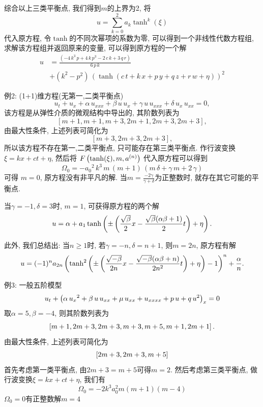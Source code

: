 \begin{frame}
综合以上三类平衡点, 我们得到$m$的上界为2, 将
\[
    u=\sum_{k=0}^2{a_k\tanh^k(\xi)}
\]
代入原方程, 令$\tanh$的不同次幂项的系数为零, 可以得到一个非线性代数方程组, 求解该方程组并返回原来的变量, 可以得到原方程的一个解
\begin{equation*}
\begin{aligned}
    u&=\frac{\left( -4\,{k}^{3}\,p+4\,k\,{p}^{3}-2\,c\,k+3\,q\,r\right) }{6\,p\,k} \\ 
    &+\left( {k}^{2}-{p}^{2}\right) \,\left( \tanh\left( c\,t+k\,x+p\,y+q\,z+r\,w+\eta\right) \right) ^{2}
\end{aligned}
\end{equation*}
\end{frame}

\begin{frame}{例2: (1+1)维方程(无第一,二类平衡点)}
\begin{equation*}
    {{u}_{t}}+{{u}_{x}}+\alpha\,{{u}_{xxx}}+\beta\,u\,{{u}_{x}}+\gamma\,u\,{{u}_{xxx}}+\delta\,{{u}_{x}}\,{{u}_{xx}}=0,
\end{equation*}
该方程是从弹性介质的微观结构中导出的, 其阶数列表为
\[
    [m+1,m+1,m+3,2m+1,2m+3,2m+3],
\]
由最大性条件, 上述列表可简化为 
\[
    [m+3,2m+3,2m+3], 
\]
所以该方程不存在第一,二类平衡点, 只可能存在第三类平衡点.  作行波变换$\xi=kx+ct+\eta$, 然后将 $F\left(\tanh(\xi),m,a^{(n)}\right)$ 代入原方程可以得到 
\begin{equation*}
    \Omega_0=-{{{a}_{0}}}^{2}\,{k}^{3}\,m\,\left( m+1\right) \,\left( m\,\delta+\gamma\,m+2\,\gamma\right)
\end{equation*}
可得 $m=0$, 原方程没有非平凡的解. 当$m=\frac{-2 \gamma}{\gamma+\delta}$为正整数时, 就存在其它可能的平衡点.
\end{frame}

\begin{frame}
当$\gamma=-1,\delta=3$时, $m=1$, 可获得原方程的两个解 
\[
    u=\alpha+a_1\tanh\left(\pm\left(\frac{\sqrt{\beta}}{2}x-\frac{\sqrt{\beta}(\alpha \beta+1)}{2}t\right)+\eta\right). 
\]

此外, 我们总结出: 当$n\ge 1$时, 若$\gamma=-n,\delta=n+1$, 则$m=2n$, 原方程有解 
\begin{equation*}
u=(-1)^n a_{2n} \left(\tanh^2\left(\pm\left(\frac{\sqrt{-\beta}}{2n}x-\frac{\sqrt{-\beta}(\alpha\beta+n)}{2n^2}t\right)+\eta\right)-1\right)^n+\frac{\alpha}{n} .
\end{equation*}
\end{frame}

\begin{frame}{例3: 一般五阶模型}
\[
    u_t+\left(\alpha\,{{{u}_{x}}}^{2}+\beta\,u\,{{u}_{xx}}+\mu\,{{u}_{xx}}+{{u}_{xxxx}}+p\,u+q\,{u}^{2} \right)_x = 0
\]
取$\alpha=5,\beta=-4$, 则其阶数列表为 
\[
    \left[m+1,2m+3,2m+3,m+3,m+5,m+1,2m+1\right] .
\]
由最大性条件, 上述列表可简化为 
\[
    \left[2m+3,2m+3,m+5\right]
\]
首先考虑第一类平衡点, 由$2m+3=m+5$可得$m=2$.
然后考虑第三类平衡点, 做行波变换$\xi=kx+ct+\eta$, 我们有 
\[
    \Omega_0 = -2k^3a_0^2m(m+1)(m-4) 
\]
$\Omega_0=0$有正整数解$m=4$
\end{frame}

